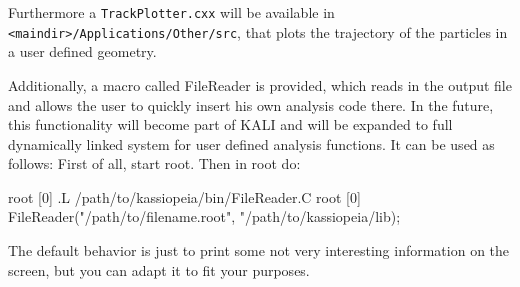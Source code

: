 Furthermore a \texttt{TrackPlotter.cxx} will be available in \texttt{<maindir>/Applications/Other/src}, that plots the trajectory of the particles in a user defined geometry.

Additionally, a macro called FileReader is provided, which reads in the output file and allows the user to quickly insert his own analysis code there. In the future, this functionality will become part of KALI and will be expanded to full dynamically linked system for user defined analysis functions. 
It can be used as follows: First of all, start root. Then in root do: 
\begin{DoxyCode}
      root [0] .L /path/to/kassiopeia/bin/FileReader.C
      root [0] FileReader("/path/to/filename.root", "/path/to/kassiopeia/lib);
\end{DoxyCode}

The default behavior is just to print some not very interesting  information on the screen, but you can adapt it to fit your purposes.

